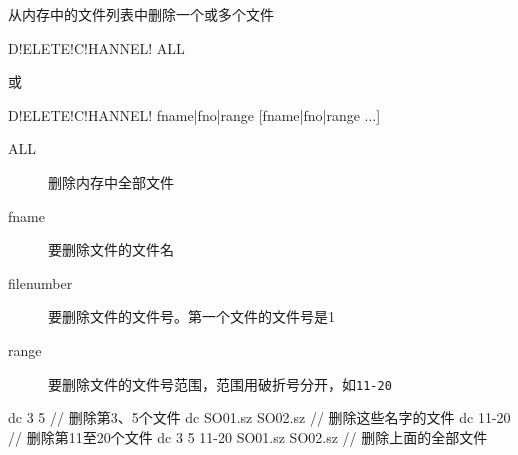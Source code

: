 \label{cmd:deletechannel}

从内存中的文件列表中删除一个或多个文件

\begin{SACSTX}
D!ELETE!C!HANNEL! ALL
\end{SACSTX}
或
\begin{SACSTX}
D!ELETE!C!HANNEL! fname|fno|range [fname|fno|range ...]
\end{SACSTX}

\begin{description}
\item [ALL] 删除内存中全部文件
\item [fname] 要删除文件的文件名
\item [filenumber] 要删除文件的文件号。第一个文件的文件号是1
\item [range] 要删除文件的文件号范围，范围用破折号分开，如\texttt{11-20}
\end{description}

\begin{SACCode}
  dc 3 5                         // 删除第3、5个文件
  dc SO01.sz SO02.sz             // 删除这些名字的文件
  dc 11-20                       // 删除第11至20个文件
  dc 3 5 11-20 SO01.sz SO02.sz   // 删除上面的全部文件
\end{SACCode}
